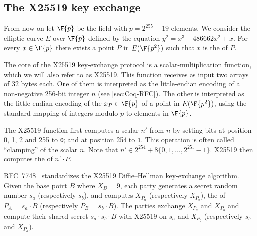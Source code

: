 \subsection{The X25519 key exchange}
\label{subsec:X25519-key-exchange}

From now on let $\F{p}$ be the field with $p=2^{255}-19$ elements.
We consider the elliptic curve $E$ over $\F{p}$ defined by the
equation $y^2 = x^3 + 486662 x^2 + x$.
For every $x \in \F{p}$ there exists a point $P$ in $E(\F{p^2})$
such that $x$ is the \xcoord of $P$.

The core of the X25519 key-exchange protocol is a scalar\hyp{}multiplication
function, which we will also refer to as X25519.
This function receives as input two arrays of $32$ bytes each.
One of them is interpreted as the little-endian encoding of a
non-negative 256-bit integer $n$ (see \ref{sec:Coq-RFC}).
The other is interpreted as the little-endian encoding of
the \xcoord $x_P \in \F{p}$ of a point in $E(\F{p^2})$,
using the standard mapping of integers modulo $p$ to elements in $\F{p}$.

The X25519 function first computes a scalar $n'$ from $n$ by setting
bits at position 0, 1, 2 and 255 to \texttt{0}; and at position 254
to \texttt{1}.
This operation is often called ``clamping'' of the scalar $n$.
Note that $n' \in 2^{254} + 8\{0,1,\ldots,2^{251}-1\}$.
X25519 then computes the \xcoord of $n'\cdot P$.

RFC~7748~\cite{rfc7748} standardizes the X25519 Diffie–Hellman key-exchange algorithm.
Given the base point $B$ where $X_B=9$, each party generates a secret random number
$s_a$ (respectively $s_b$), and computes $X_{P_a}$ (respectively $X_{P_b}$), the
\xcoord of $P_A = s_a \cdot B$ (respectively $P_B = s_b \cdot B$).
The parties exchange $X_{P_a}$ and $X_{P_b}$ and compute their shared secret
$s_a \cdot  s_b \cdot B$ with
X25519 on $s_a$ and $X_{P_b}$ (respectively $s_b$ and $X_{P_a}$).
